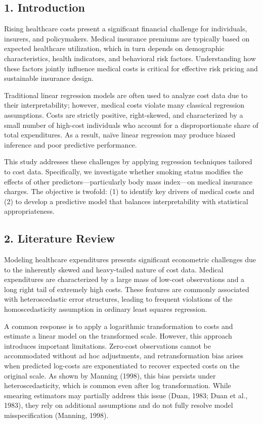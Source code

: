 \documentclass[
  letterpaper,
  DIV=11,
  numbers=noendperiod]{scrartcl}
\begin{document}
\subsection{\texorpdfstring{\textbf{1.
Introduction}}{1. Introduction}}\label{introduction}

Rising healthcare costs present a significant financial challenge for
individuals, insurers, and policymakers. Medical insurance premiums are
typically based on expected healthcare utilization, which in turn
depends on demographic characteristics, health indicators, and
behavioral risk factors. Understanding how these factors jointly
influence medical costs is critical for effective risk pricing and
sustainable insurance design.

Traditional linear regression models are often used to analyze cost data
due to their interpretability; however, medical costs violate many
classical regression assumptions. Costs are strictly positive,
right-skewed, and characterized by a small number of high-cost
individuals who account for a disproportionate share of total
expenditures. As a result, naïve linear regression may produce biased
inference and poor predictive performance.

This study addresses these challenges by applying regression techniques
tailored to cost data. Specifically, we investigate whether smoking
status modifies the effects of other predictors---particularly body mass
index---on medical insurance charges. The objective is twofold: (1) to
identify key drivers of medical costs and (2) to develop a predictive
model that balances interpretability with statistical appropriateness.

\subsection{\texorpdfstring{\textbf{2. Literature
Review}}{2. Literature Review}}\label{literature-review}

Modeling healthcare expenditures presents significant econometric
challenges due to the inherently skewed and heavy-tailed nature of cost
data. Medical expenditures are characterized by a large mass of low-cost
observations and a long right tail of extremely high costs. These
features are commonly associated with heteroscedastic error structures,
leading to frequent violations of the homoscedasticity assumption in
ordinary least squares regression.

A common response is to apply a logarithmic transformation to costs and
estimate a linear model on the transformed scale. However, this approach
introduces important limitations. Zero-cost observations cannot be
accommodated without ad hoc adjustments, and retransformation bias
arises when predicted log-costs are exponentiated to recover expected
costs on the original scale. As shown by Manning (1998), this bias
persists under heteroscedasticity, which is common even after log
transformation. While smearing estimators may partially address this
issue (Duan, 1983; Duan et al., 1983), they rely on additional
assumptions and do not fully resolve model misspecification (Manning,
1998).
\end{document}
